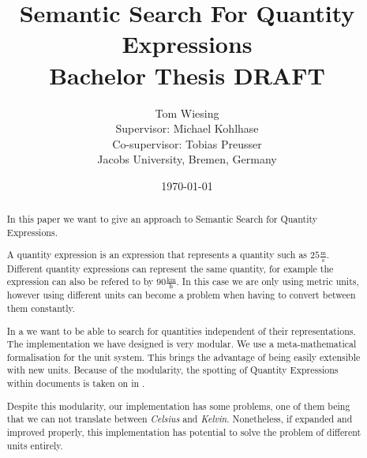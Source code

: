 \documentclass[11pt]{article}
\title{Semantic Search For Quantity Expressions\\ \vspace{2 mm} Bachelor Thesis DRAFT\ednote{Remove draft status}}
\author{Tom Wiesing\\Supervisor: Michael Kohlhase\\Co-supervisor: Tobias Preusser\\Jacobs University, Bremen, Germany}
\date{\today}
\begin{document}
\maketitle

\begin{abstract}

  \noindent In this paper we want to give an approach to Semantic Search for Quantity Expressions.

  A quantity expression is an expression that represents a quantity such as $25 \frac{\text{m}}{\text{s}}$. Different quantity expressions can represent the same quantity, for example the expression can also be refered to by $90 \frac{\text{km}}{\text{h}}$. In this case we are only using metric units, however using different units can become a problem when having to convert between them constantly.

  In a  we want to be able to search for quantities independent of their representations. The implementation we have designed is very modular. We use a meta-mathematical formalisation for the unit system. This brings the advantage of being easily extensible with new units. Because of the modularity, the spotting of Quantity Expressions within documents is taken on in \cite{thesis:sharko}.

  Despite this modularity, our implementation has some problems, one of them being that we can not translate between \textit{Celsius} and \textit{Kelvin}. Nonetheless, if expanded and improved properly, this implementation has potential to solve the problem of different units entirely.

\end{abstract}

\newpage

\tableofcontents

\FloatBarrier
\newpage



\FloatBarrier
\newpage



\FloatBarrier
\newpage



\FloatBarrier
\newpage




\FloatBarrier
\newpage



\FloatBarrier
\newpage



\newpage

{}
\end{document}
